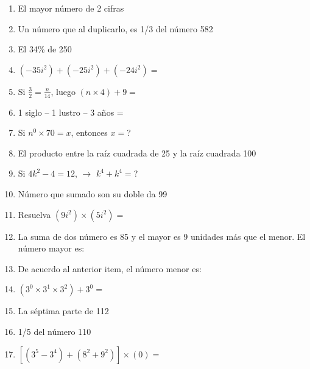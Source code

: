 \documentclass[letterpaper,11pt,twoside]{article}
\begin{document}
\begin{multicols}{2}
\begin{enumerate}
 \item El mayor número de 2 cifras
 \item Un número que al duplicarlo, es 1/3 del número 582
 \item El 34\% de 250
 \item $(-35i^{2})+(-25i^{2})+(-24i^{2})=$
 \item Si $\frac{3}{2}=\frac{n}{14}$, luego $(n\times 4)+9=$
 \item 1 siglo -- 1 lustro -- 3 años =
 \item Si $n^{0}\times 70=x$, entonces $x=$?
 \item El producto entre la raíz cuadrada de 25 y la raíz cuadrada 100
 \item Si $4k^{2}-4=12$, $\rightarrow$ $k^{4}+k^{4}=$?
 \item Número que sumado son su doble da 99
 \item Resuelva $(9i^{2})\times (5i^{2})=$
 \item La suma de dos número es 85 y el mayor es 9 unidades más que el menor. El número mayor es:
 \item De acuerdo al anterior item, el número menor es:
 \item $(3^{0}\times 3^{1}\times 3^{2})+3^{0}=$
 \item La séptima parte de 112
 \item 1/5 del número 110
 \item $[(3^{5}-3^{4})+(8^{2}+9^{2})]\times (0)=$
 \end{enumerate}
\end{multicols}
\end{document}
